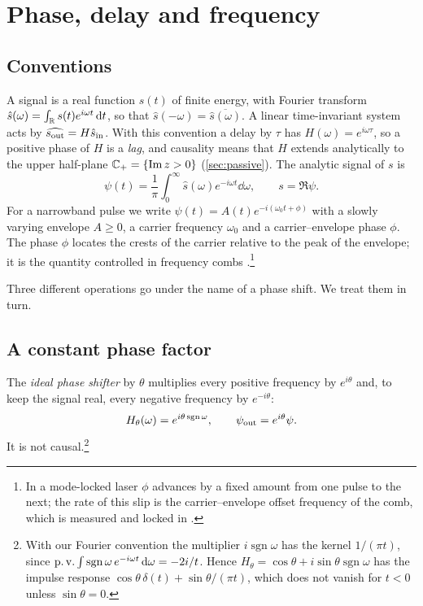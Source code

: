 \section{Phase, delay and frequency}\label{sec:kinematics}

\subsection{Conventions}

A signal is a real function $s(t)$ of finite energy, with Fourier transform
$\hat s(\omega)=\int_\mathbb R s(t)e^{i\omega t}\,\mathrm d t$, so that
$\hat s(-\omega)=\overline{\hat s(\omega)}$. A linear time-invariant system
acts by $\widehat{s_{\rm out}}=H\hat s_{\rm in}$. With this convention a
delay by $\tau$ has $H(\omega)=e^{i\omega\tau}$, so a positive phase of $H$
is a \emph{lag}, and causality means that $H$ extends analytically to the
upper half-plane $\mathbb C_{+}=\{\operatorname{Im} z>0\}$ (\cref{sec:passive}). The analytic signal
of $s$ is
\[
\psi(t)=\frac1\pi\int_0^\infty\hat s(\omega)e^{-i\omega t}\dd\omega ,
\qquad s=\Re\psi .
\]
For a narrowband pulse we write $\psi(t)=A(t)e^{-i(\omega_0t+\phi)}$ with a
slowly varying envelope $A\ge0$, a carrier frequency $\omega_0$ and a
carrier--envelope phase $\phi$. The phase $\phi$ locates the crests of the
carrier relative to the peak of the envelope; it is the quantity controlled
in frequency combs \cite{telle,apolonski}.\footnote{In a mode-locked laser $\phi$ advances by a fixed amount from one pulse to the next; the rate of this slip is the carrier--envelope offset frequency of the comb, which is measured and locked in \cite{telle,apolonski}.}

Three different operations go under the name of a phase shift. We treat
them in turn.

\subsection{A constant phase factor}

The \emph{ideal phase shifter} by $\theta$ multiplies every positive
frequency by $e^{i\theta}$ and, to keep the signal real, every negative
frequency by $e^{-i\theta}$:
\begin{equation}\label{eq:ideal}
H_\theta(\omega)=e^{i\theta\operatorname{sgn}\omega},\qquad
\psi_{\rm out}=e^{i\theta}\psi .
\end{equation}
It is not causal.\footnote{With our Fourier convention the multiplier $i\operatorname{sgn}\omega$ has the kernel $1/(\pi t)$, since $\operatorname{p.v.}\int\operatorname{sgn}\omega\,e^{-i\omega t}\,\mathrm d\omega=-2i/t$. Hence $H_\theta=\cos\theta+i\sin\theta\operatorname{sgn}\omega$ has the impulse response $\cos\theta\,\delta(t)+\sin\theta/(\pi t)$, which does not vanish for $t<0$ unless $\sin\theta=0$.}

